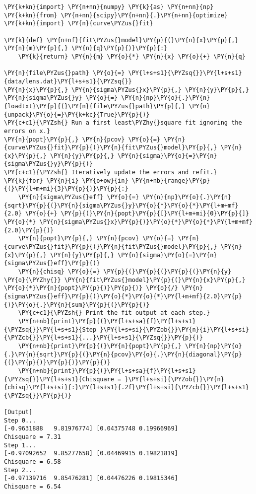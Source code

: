 \begin{Verbatim}[label=\makebox{\href{https://bitbucket.org/lbaldini/statnotes/src/master/snippets/least\_squares\_modified.py}{https://bitbucket.org/.../least\_squares\_modified.py}},commandchars=\\\{\}]
\PY{k+kn}{import} \PY{n+nn}{numpy} \PY{k}{as} \PY{n+nn}{np}
\PY{k+kn}{from} \PY{n+nn}{scipy}\PY{n+nn}{.}\PY{n+nn}{optimize} \PY{k+kn}{import} \PY{n}{curve\PYZus{}fit}

\PY{k}{def} \PY{n+nf}{fit\PYZus{}model}\PY{p}{(}\PY{n}{x}\PY{p}{,} \PY{n}{m}\PY{p}{,} \PY{n}{q}\PY{p}{)}\PY{p}{:}
    \PY{k}{return} \PY{n}{m} \PY{o}{*} \PY{n}{x} \PY{o}{+} \PY{n}{q}

\PY{n}{file\PYZus{}path} \PY{o}{=} \PY{l+s+s1}{\PYZsq{}}\PY{l+s+s1}{data/lens.dat}\PY{l+s+s1}{\PYZsq{}}
\PY{n}{x}\PY{p}{,} \PY{n}{sigma\PYZus{}x}\PY{p}{,} \PY{n}{y}\PY{p}{,} \PY{n}{sigma\PYZus{}y} \PY{o}{=} \PY{n}{np}\PY{o}{.}\PY{n}{loadtxt}\PY{p}{(}\PY{n}{file\PYZus{}path}\PY{p}{,} \PY{n}{unpack}\PY{o}{=}\PY{k+kc}{True}\PY{p}{)}
\PY{c+c1}{\PYZsh{} Run a first least\PYZhy{}square fit ignoring the errors on x.}
\PY{n}{popt}\PY{p}{,} \PY{n}{pcov} \PY{o}{=} \PY{n}{curve\PYZus{}fit}\PY{p}{(}\PY{n}{fit\PYZus{}model}\PY{p}{,} \PY{n}{x}\PY{p}{,} \PY{n}{y}\PY{p}{,} \PY{n}{sigma}\PY{o}{=}\PY{n}{sigma\PYZus{}y}\PY{p}{)}
\PY{c+c1}{\PYZsh{} Iteratively update the errors and refit.}
\PY{k}{for} \PY{n}{i} \PY{o+ow}{in} \PY{n+nb}{range}\PY{p}{(}\PY{l+m+mi}{3}\PY{p}{)}\PY{p}{:}
    \PY{n}{sigma\PYZus{}eff} \PY{o}{=} \PY{n}{np}\PY{o}{.}\PY{n}{sqrt}\PY{p}{(}\PY{n}{sigma\PYZus{}y}\PY{o}{*}\PY{o}{*}\PY{l+m+mf}{2.0} \PY{o}{+} \PY{p}{(}\PY{n}{popt}\PY{p}{[}\PY{l+m+mi}{0}\PY{p}{]} \PY{o}{*} \PY{n}{sigma\PYZus{}x}\PY{p}{)}\PY{o}{*}\PY{o}{*}\PY{l+m+mf}{2.0}\PY{p}{)}
    \PY{n}{popt}\PY{p}{,} \PY{n}{pcov} \PY{o}{=} \PY{n}{curve\PYZus{}fit}\PY{p}{(}\PY{n}{fit\PYZus{}model}\PY{p}{,} \PY{n}{x}\PY{p}{,} \PY{n}{y}\PY{p}{,} \PY{n}{sigma}\PY{o}{=}\PY{n}{sigma\PYZus{}eff}\PY{p}{)}
    \PY{n}{chisq} \PY{o}{=} \PY{p}{(}\PY{p}{(}\PY{p}{(}\PY{n}{y} \PY{o}{\PYZhy{}} \PY{n}{fit\PYZus{}model}\PY{p}{(}\PY{n}{x}\PY{p}{,} \PY{o}{*}\PY{n}{popt}\PY{p}{)}\PY{p}{)} \PY{o}{/} \PY{n}{sigma\PYZus{}eff}\PY{p}{)}\PY{o}{*}\PY{o}{*}\PY{l+m+mf}{2.0}\PY{p}{)}\PY{o}{.}\PY{n}{sum}\PY{p}{(}\PY{p}{)}
    \PY{c+c1}{\PYZsh{} Print the fit output at each step.}
    \PY{n+nb}{print}\PY{p}{(}\PY{l+s+sa}{f}\PY{l+s+s1}{\PYZsq{}}\PY{l+s+s1}{Step }\PY{l+s+si}{\PYZob{}}\PY{n}{i}\PY{l+s+si}{\PYZcb{}}\PY{l+s+s1}{...}\PY{l+s+s1}{\PYZsq{}}\PY{p}{)}
    \PY{n+nb}{print}\PY{p}{(}\PY{n}{popt}\PY{p}{,} \PY{n}{np}\PY{o}{.}\PY{n}{sqrt}\PY{p}{(}\PY{n}{pcov}\PY{o}{.}\PY{n}{diagonal}\PY{p}{(}\PY{p}{)}\PY{p}{)}\PY{p}{)}
    \PY{n+nb}{print}\PY{p}{(}\PY{l+s+sa}{f}\PY{l+s+s1}{\PYZsq{}}\PY{l+s+s1}{Chisquare = }\PY{l+s+si}{\PYZob{}}\PY{n}{chisq}\PY{l+s+si}{:}\PY{l+s+s1}{.2f}\PY{l+s+si}{\PYZcb{}}\PY{l+s+s1}{\PYZsq{}}\PY{p}{)}

[Output]
Step 0...
[-0.9631888   9.81976774] [0.04375748 0.19966969]
Chisquare = 7.31
Step 1...
[-0.97092652  9.85277658] [0.04469915 0.19821819]
Chisquare = 6.58
Step 2...
[-0.97139716  9.85476281] [0.04476226 0.19815346]
Chisquare = 6.54
\end{Verbatim}